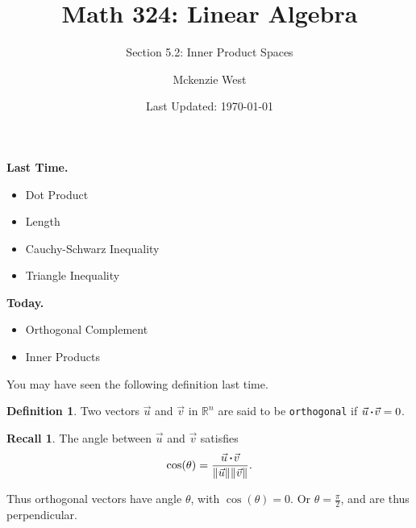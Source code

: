 \documentclass{beamer}
\newcommand{\R}{\mathbb{R}}
\newcommand{\fn}{\insertframenumber}
\newcommand{\dotp}{\,{\boldsymbol{\cdot}\hspace*{.01in}}}
\theoremstyle{definition}
\newtheorem*{defn}{Definition}
\newtheorem*{recall}{Recall}
\renewcommand{\emph}[1]{{\color{blue}\texttt{#1}}}
\begin{document}
	\title{Math 324: Linear Algebra}
	\subtitle{Section 5.2: Inner Product Spaces}
	\author{Mckenzie West}
	\date{Last Updated: \today}
\begin{frame}
\maketitle
\end{frame}

\begin{frame}{\insertframenumber}
	\begin{block}{\textbf{Last Time.}}
	\begin{itemize}[label=--]
		\item Dot Product
		\item Length
		\item Cauchy-Schwarz Inequality
		\item Triangle Inequality
	\end{itemize}
	\end{block}
	\begin{block}{\textbf{Today.}}
		\begin{itemize}[label=--]
			\item Orthogonal Complement
			\item Inner Products
		\end{itemize}
	\end{block}
\end{frame}
\begin{frame}{\fn}
	You  may have seen the following definition last time.
	\begin{defn}
		Two vectors $\vec u$ and $\vec v$ in $\R^n$ are said to be \emph{orthogonal} if $\vec u\dotp\vec v=0$.
	\end{defn}
	\begin{recall}
		The angle between $\vec u$ and $\vec v$ satisfies $$\cos(\theta)=\frac{\vec u\dotp \vec v}{\|\vec u\|\|\vec v\|}.$$
		
		Thus orthogonal vectors have angle $\theta$, with $\cos(\theta)=0$.  Or $\theta=\frac{\pi}{2}$, and are thus perpendicular.
	\end{recall}
\end{frame}
\end{document}
